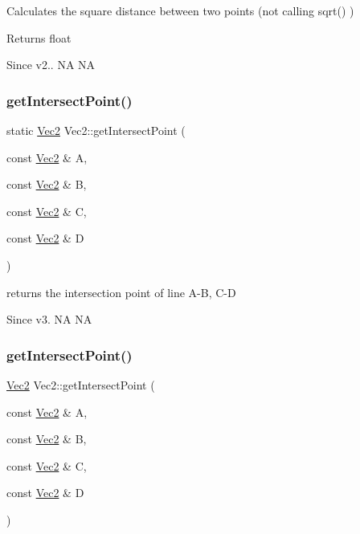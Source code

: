 Calculates the square distance between two points (not calling sqrt() ) \begin{DoxyReturn}{Returns}
float 
\end{DoxyReturn}
\begin{DoxySince}{Since}
v2..  NA  NA 
\end{DoxySince}
\mbox{\label{classVec2_a6b7881ab13c3e0336ef1f77340df8b86}} 
\subsubsection{\texorpdfstring{get\+Intersect\+Point()}{getIntersectPoint()}\hspace{0.1cm}{\footnotesize\ttfamily [1/2]}}
{\footnotesize\ttfamily static \hyperlink{classVec2}{Vec2} Vec2\+::get\+Intersect\+Point (\begin{DoxyParamCaption}\item[{const \hyperlink{classVec2}{Vec2} \&}]{A,  }\item[{const \hyperlink{classVec2}{Vec2} \&}]{B,  }\item[{const \hyperlink{classVec2}{Vec2} \&}]{C,  }\item[{const \hyperlink{classVec2}{Vec2} \&}]{D }\end{DoxyParamCaption})\hspace{0.3cm}{\ttfamily [static]}}

returns the intersection point of line A-\/B, C-\/D \begin{DoxySince}{Since}
v3.  NA  NA 
\end{DoxySince}
\mbox{\label{classVec2_ac0ffe8d77f93b1d6fa13d786d079f382}} 
\subsubsection{\texorpdfstring{get\+Intersect\+Point()}{getIntersectPoint()}\hspace{0.1cm}{\footnotesize\ttfamily [2/2]}}
{\footnotesize\ttfamily \hyperlink{classVec2}{Vec2} Vec2\+::get\+Intersect\+Point (\begin{DoxyParamCaption}\item[{const \hyperlink{classVec2}{Vec2} \&}]{A,  }\item[{const \hyperlink{classVec2}{Vec2} \&}]{B,  }\item[{const \hyperlink{classVec2}{Vec2} \&}]{C,  }\item[{const \hyperlink{classVec2}{Vec2} \&}]{D }\end{DoxyParamCaption})\hspace{0.3cm}{\ttfamily [static]}}

